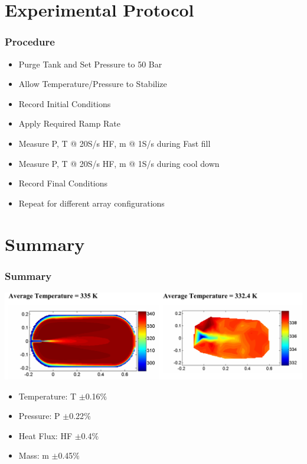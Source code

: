 \documentclass[10pt]{beamer}
\begin{document}
\section{Experimental Protocol}

\begin{frame}
\frametitle{Procedure}
\begin{itemize}
\item Purge Tank and Set Pressure to 50 Bar
\item Allow Temperature/Pressure to Stabilize 
\item Record Initial Conditions
\item Apply Required Ramp Rate
\item Measure P, T @ 20S/s HF, m @ 1S/s during Fast fill
\item Measure P, T @ 20S/s HF, m @ 1S/s during cool down
\item Record Final Conditions
\item Repeat for different array configurations
\end{itemize}
\end{frame}



\section{Summary}
\begin{frame}
\frametitle{Summary}
\includegraphics[height=0.25\textwidth]{fin}




\begin{itemize}
      \item Temperature: T $\pm$0.16$\%$
      \item Pressure: P $\pm$0.22$\%$
      \item Heat Flux: HF $\pm$0.4$\%$
      \item Mass: m $\pm$0.45$\%$
      \end{itemize}
\end{frame}
\end{document}
